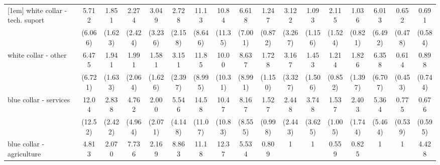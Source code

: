 {\begin{tabular}{l*{16}{c}}
[1em]
white collar - tech. suport&       5.712         &       1.851         &       2.274         &       3.049         &       2.728         &       11.13\sym{**} &       10.84\sym{*}  &       6.618         &       1.247         &       3.122         &       1.093         &       2.115         &       1.036         &       6.013         &       0.652         &       0.691         \\
                    &     (6.066)         &     (1.623)         &     (2.424)         &     (3.236)         &     (2.158)         &     (8.646)         &     (11.35)         &     (7.001)         &     (0.872)         &     (3.267)         &     (1.156)         &     (1.524)         &     (0.821)         &     (6.492)         &     (0.478)         &     (0.584)         \\
[1em]
white collar - other&       6.475         &       1.941         &       1.991         &       1.581         &       3.151         &       11.85\sym{**} &       10.00\sym{*}  &       8.637\sym{*}  &       1.728         &       3.167         &       1.453         &       1.214         &       1.826         &       6.358         &       0.614         &       0.898         \\
                    &     (6.721)         &     (1.633)         &     (2.064)         &     (1.626)         &     (2.397)         &     (8.995)         &     (10.31)         &     (8.991)         &     (1.150)         &     (3.327)         &     (1.506)         &     (0.852)         &     (1.397)         &     (6.707)         &     (0.453)         &     (0.744)         \\
[1em]
blue collar - services&       12.04\sym{*}  &       2.838         &       4.762         &       2.000         &       5.546\sym{*}  &       14.58\sym{***}&       10.47\sym{*}  &       8.167\sym{*}  &       1.527         &       2.448         &       3.748         &       1.537         &       2.403         &       5.364         &       0.775         &       0.676         \\
                    &     (12.52)         &     (2.422)         &     (4.964)         &     (2.071)         &     (4.148)         &     (11.07)         &     (10.83)         &     (8.555)         &     (0.998)         &     (2.443)         &     (3.625)         &     (1.005)         &     (1.744)         &     (5.464)         &     (0.539)         &     (0.595)         \\
[1em]
blue collar - agriculture&       4.813         &       2.070         &       7.736         &       2.169         &       8.863         &       11.18\sym{*}  &       12.37         &       5.534         &       0.809         &           1         &           1         &       0.559         &       0.825         &           1         &           1         &       4.428         \\

\end{tabular}}
